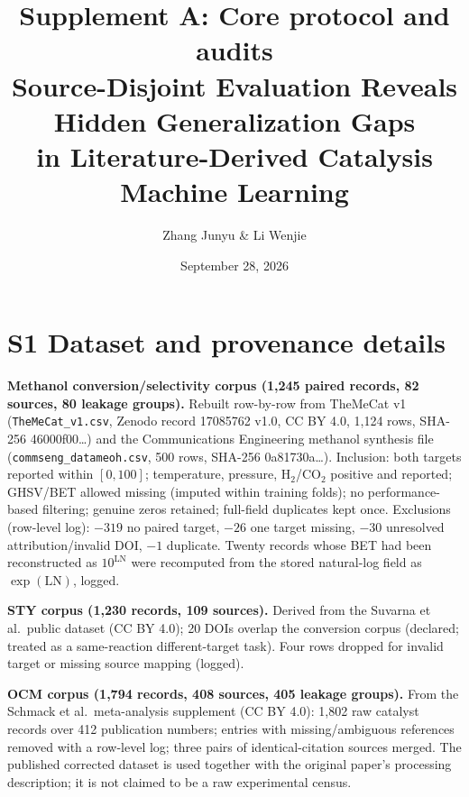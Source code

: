 \documentclass[11pt,a4paper]{article}
\title{\textbf{Supplement A: Core protocol and audits}\\
\textbf{Source-Disjoint Evaluation Reveals Hidden Generalization Gaps\\
in Literature-Derived Catalysis Machine Learning}}
\author{Zhang Junyu \& Li Wenjie}
\date{September 28, 2026}
\begin{document}
\renewcommand{\thepage}{A\arabic{page}}\renewcommand{\thetable}{A\arabic{table}}
\maketitle
\tableofcontents

\section{S1 Dataset and provenance details}
\textbf{Methanol conversion/selectivity corpus (1,245 paired records, 82 sources, 80
leakage groups).} Rebuilt row-by-row from TheMeCat v1 (\texttt{TheMeCat\_v1.csv},
Zenodo record 17085762 v1.0, CC BY 4.0, 1,124 rows, SHA-256 46000f00\ldots) and the
Communications Engineering methanol synthesis file (\texttt{commseng\_datameoh.csv},
500 rows, SHA-256 0a81730a\ldots). Inclusion: both targets reported within $[0,100]$;
temperature, pressure, H$_2$/CO$_2$ positive and reported; GHSV/BET allowed missing
(imputed within training folds); no performance-based filtering; genuine zeros retained;
full-field duplicates kept once. Exclusions (row-level log): $-319$ no paired target,
$-26$ one target missing, $-30$ unresolved attribution/invalid DOI, $-1$ duplicate.
Twenty records whose BET had been reconstructed as $10^{\mathrm{LN}}$ were recomputed
from the stored natural-log field as $\exp(\mathrm{LN})$, logged.

\textbf{STY corpus (1,230 records, 109 sources).} Derived from the Suvarna et al.\
public dataset (CC BY 4.0); 20 DOIs overlap the conversion corpus (declared; treated as
a same-reaction different-target task). Four rows dropped for invalid target or missing
source mapping (logged).

\textbf{OCM corpus (1,794 records, 408 sources, 405 leakage groups).} From the Schmack
et al.\ meta-analysis supplement (CC BY 4.0): 1,802 raw catalyst records over 412
publication numbers; entries with missing/ambiguous references removed with a row-level
log; three pairs of identical-citation sources merged. The published corrected dataset
is used together with the original paper's processing description; it is not claimed to
be a raw experimental census.
\end{document}
